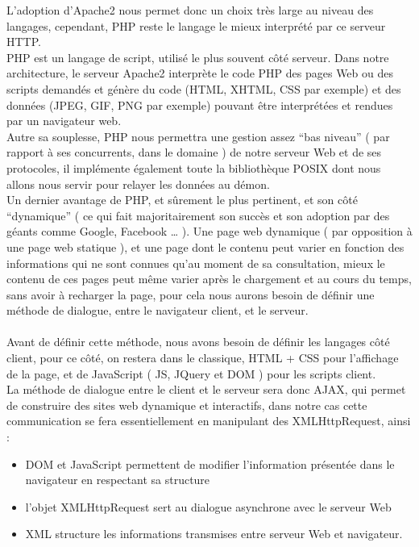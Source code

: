 L’adoption d’Apache2 nous permet donc un choix très large au niveau des langages, cependant, PHP reste le langage le mieux interprété par ce serveur HTTP.\\
PHP est un langage de script, utilisé le plus souvent côté serveur. Dans notre architecture, le serveur Apache2 interprète le code PHP des pages Web ou des scripts demandés et génère du code (HTML, XHTML, CSS par exemple) et des données (JPEG, GIF, PNG par exemple) pouvant être interprétées et rendues par un navigateur web.\\
Autre sa souplesse, PHP nous permettra une gestion assez ``bas niveau'' ( par rapport à ses concurrents, dans le domaine ) de notre serveur Web et de ses protocoles, il implémente également toute la bibliothèque POSIX dont nous allons nous servir pour relayer les données au démon.\\
Un dernier avantage de PHP, et sûrement le plus pertinent, et son côté ``dynamique'' ( ce qui fait majoritairement son succès et son adoption par des géants comme Google, Facebook … ). Une page web dynamique ( par opposition à une page web statique ), et une page dont le contenu peut varier en fonction des informations qui ne sont connues qu’au moment de sa consultation, mieux le contenu de ces pages peut même varier après le chargement et au cours du temps, sans avoir à recharger la page, pour cela nous aurons besoin de définir une méthode de dialogue, entre le navigateur client, et le serveur.\\
\\
Avant de définir cette méthode, nous avons besoin de définir les langages côté client, pour ce côté, on restera dans le classique, HTML + CSS pour l’affichage de la page, et de JavaScript ( JS, JQuery et DOM ) pour les scripts client.
\\
La méthode de dialogue entre le client et le serveur sera donc AJAX, qui permet de construire des sites web dynamique et interactifs, dans notre cas cette communication se fera essentiellement en manipulant des XMLHttpRequest, ainsi :
\begin{itemize}
\item DOM et JavaScript permettent de modifier l'information présentée dans le navigateur en respectant sa structure
\item l'objet XMLHttpRequest sert au dialogue asynchrone avec le serveur Web
\item XML structure les informations transmises entre serveur Web et navigateur.
\end{itemize}

